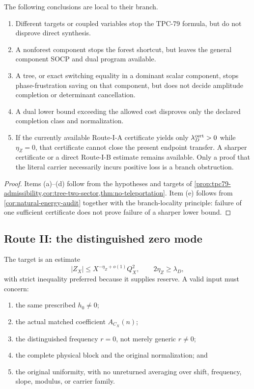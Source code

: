 \begin{proposition}
\label{prop:routeI-rules}
The following conclusions are local to their branch.
\begin{enumerate}[label=(\alph*),leftmargin=2.2em]
\item Different targets or coupled variables stop the TPC-79 formula,
but do not disprove direct synthesis.
\item A nonforest component stops the forest shortcut, but leaves the
general component SOCP and dual program available.
\item A tree, or exact switching equality in a dominant scalar
component, stops phase-frustration saving on that component, but does
not decide amplitude completion or determinant cancellation.
\item A dual lower bound exceeding the allowed cost disproves only
the declared completion class and normalization.
\item If the currently available Route-I-A certificate yields only
\(\lambda_D^{\rm cert}>0\) while \(\eta_Z=0\), that certificate cannot
close the present endpoint transfer.  A sharper certificate or a
direct Route-I-B estimate remains available.  Only a proof that the
literal carrier necessarily incurs positive loss is a branch
obstruction.
\end{enumerate}
\end{proposition}

\begin{proof}
Items (a)--(d) follow from the hypotheses and targets of
\cref{prop:tpc79-admissibility,cor:tree-two-sector,thm:no-teleportation}.
Item (e) follows from \cref{cor:natural-energy-audit} together with
the branch-locality principle: failure of one sufficient certificate
does not prove failure of a sharper lower bound.
\end{proof}

\subsection{Route II: the distinguished zero mode}

The target is an estimate
\begin{equation}
 |Z_X|\le X^{-\eta_Z+o(1)}Q_X^2,
\qquad
 2\eta_Z\ge\lambda_D,
\label{eq:routeII-target}
\end{equation}
with strict inequality preferred because it supplies reserve.  A
valid input must concern:
\begin{enumerate}[label=(Z\arabic*),leftmargin=2.7em]
\item the same prescribed \(h_0\ne0\);
\item the actual matched coefficient \(A_{C_X}(n)\);
\item the distinguished frequency \(r=0\), not merely generic
\(r\ne0\);
\item the complete physical block and the original normalization; and
\item the original uniformity, with no unreturned averaging over
shift, frequency, slope, modulus, or carrier family.
\end{enumerate}

